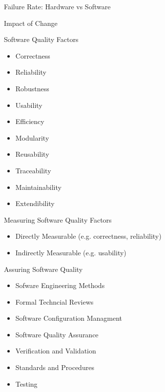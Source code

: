 \documentclass[aspectratio=1610,xcolor=dvipsnames,t,compress]{beamer}
\begin{document}
\begin{frame}{Failure Rate: Hardware vs Software} 
\end{frame} 

\begin{frame}{Impact of Change}
\end{frame}

\begin{frame}{Software Quality Factors} 
    \begin{itemize}
        \item Correctness
        \item Reliability
        \item Robustness
        \item Usability
        \item Efficiency
        \item Modularity
        \item Reusability
        \item Traceability
        \item Maintainability
        \item Extendibility
    \end{itemize}
    \begin{block}{Measuring Software Quality Factors}
        \begin{itemize}
            \item Directly Measurable (e.g. correctness, reliability)
            \item Indirectly Measurable (e.g. usability)
        \end{itemize}
    \end{block} 
\end{frame}

\begin{frame}{Assuring Software Quality} 
    \begin{itemize}
        \item Sofware Engineering Methods
        \item Formal Techncial Reviews
        \item Software Configuration Managment
        \item Software Quality Assurance
        \item Verification and Validation
        \item Standards and Procedures
        \item Testing
    \end{itemize}
\end{frame}
\end{document}
